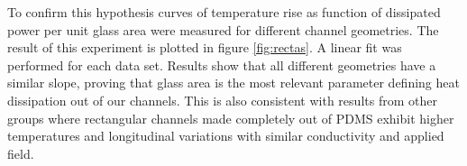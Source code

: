 \documentclass[twocolumn]{svjour3}       %
\begin{document}
To confirm this hypothesis curves of temperature rise as function of dissipated power per unit glass area were measured for different channel geometries. The result of this experiment is plotted in figure \ref{fig:rectas}. A linear fit was performed for each data set. Results show that all different geometries have a similar slope, proving that glass area is the most relevant parameter defining heat dissipation out of our channels. This is also consistent with results from other groups \cite{competencia1} where rectangular channels made completely out of PDMS exhibit higher temperatures and longitudinal variations with similar conductivity and applied field. 





\end{document}
